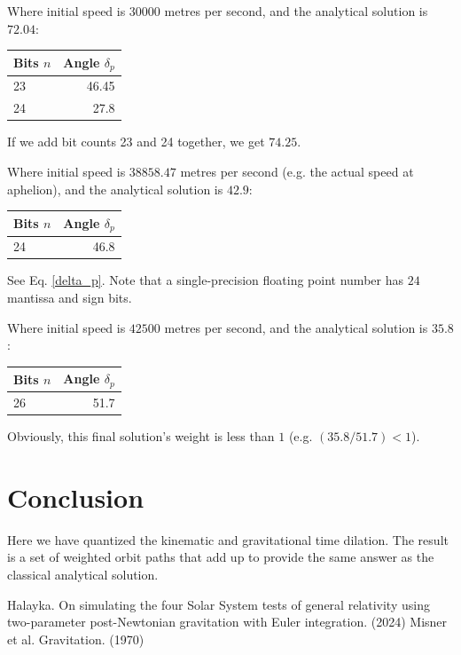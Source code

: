 \documentclass[12pt]{article}
\begin{document}
Where initial speed is $30000$ metres per second, and the analytical solution is $72.04$:
\begin{center}
\begin{tabular}{| l | r |}
  \hline
Bits $n$ & Angle $\delta_{p}$\\
\hline
\hline
23 & 46.45 \\
24 & 27.8 \\
  \hline  
\end{tabular}
\end{center}
If we add bit counts 23 and 24 together, we get $74.25$.

Where initial speed is $38858.47$ metres per second (e.g. the actual speed at aphelion), and the analytical solution is $42.9$:
\begin{center}
\begin{tabular}{| l | r |}
  \hline
Bits $n$ & Angle $\delta_{p}$ \\
\hline
\hline
24 & 46.8 \\
  \hline  
\end{tabular}
\end{center}
See Eq. \ref{delta_p}.
Note that a single-precision floating point number has $24$ mantissa and sign bits.

Where initial speed is $42500$ metres per second, and the analytical solution is $35.8$:
\begin{center}
\begin{tabular}{| l | r |}
  \hline
Bits $n$ & Angle $\delta_{p}$\\
\hline
\hline
26 & 51.7 \\
  \hline  
\end{tabular}
\end{center}
Obviously, this final solution's weight is less than $1$ (e.g. $(35.8 / 51.7) < 1$).




\section{Conclusion}

Here we have quantized the kinematic and gravitational time dilation.
The result is a set of weighted orbit paths that add up to provide the same answer as the classical analytical solution.





\begin{thebibliography}{9}


 Halayka. On simulating the four Solar System tests of general relativity using two-parameter post-Newtonian gravitation with Euler integration. (2024)
 Misner et al. Gravitation. (1970)

\end{thebibliography}
\end{document}
